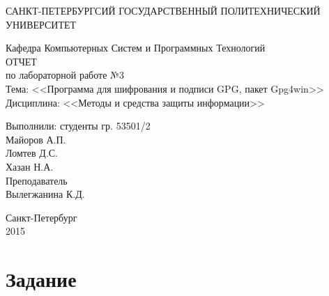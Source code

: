 \documentclass[utf8x, 12pt]{G7-32}
\begin{document}
\frontmatter 


\begin{center} 

\large САНКТ-ПЕТЕРБУРГСИЙ ГОСУДАРСТВЕННЫЙ ПОЛИТЕХНИЧЕСКИЙ УНИВЕРСИТЕТ

\large Кафедра Компьютерных Систем и Программных Технологий \\[5.5cm] 

\huge ОТЧЕТ \\[0.6cm] %
\large по лабораторной работе №3\\
\large Тема: <<Программа для шифрования и подписи GPG, пакет Gpg4win>>\\
\large Дисциплина: <<Методы и средства защиты информации>>\\[3.7cm]

\end{center} 

\begin{flushright}
Выполнили: студенты гр. 53501/2 \\
Майоров А.П.\\
Ломтев Д.С.\\
Хазан Н.А. \\[1.2cm]


Преподаватель \\
Вылегжанина К.Д.
\end{flushright}


\vfill 

\begin{center} 
\large Санкт-Петербург \\
2015
\end{center} 

\thispagestyle{empty}



\thispagestyle{empty}
\setcounter{page}{0}
\tableofcontents
\clearpage
\mainmatter


\chapter{Задание}
\end{document}
